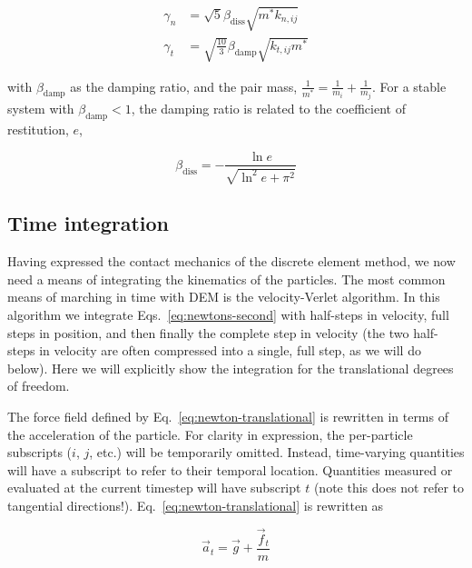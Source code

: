 \begin{subequations}
\begin{align}
	\gamma_n &= \sqrt{5}\beta_\text{diss}\sqrt{m^*k_{n,ij}} \\
	\gamma_t &= \sqrt{\frac{10}{3}}\beta_\text{damp}\sqrt{k_{t,ij} m^*}
\end{align}
\end{subequations}

with $\beta_\text{damp}$ as the damping ratio, and the pair mass, $\frac{1}{m^*} = \frac{1}{m_i} + \frac{1}{m_j}$. For a stable system with $\beta_\text{damp} < 1$, the damping ratio is related to the coefficient of restitution, $e$,

\begin{equation}
	\beta_\text{diss} = -\frac{\ln{e}}{\sqrt{\ln^2{e}+\pi^2}}
\end{equation}





\subsection{Time integration}

Having expressed the contact mechanics of the discrete element method, we now need a means of integrating the kinematics of the particles. The most common means of marching in time with DEM is the velocity-Verlet algorithm\cite{Kruggel-Emden2008}. In this algorithm we integrate Eqs.~\ref{eq:newtons-second} with half-steps in velocity, full steps in position, and then finally the complete step in velocity (the two half-steps in velocity are often compressed into a single, full step, as we will do below). Here we will explicitly show the integration for the translational degrees of freedom. 

The force field defined by Eq.~\ref{eq:newton-translational} is rewritten in terms of the acceleration of the particle. For clarity in expression, the per-particle subscripts ($i$, $j$, etc.) will be temporarily omitted. Instead, time-varying quantities will have a subscript to refer to their temporal location. Quantities measured or evaluated at the current timestep will have subscript $t$ (note this does not refer to tangential directions!). Eq.~\ref{eq:newton-translational} is rewritten as

\begin{equation}\label{eq:newton-acceleration}
	\vec{a}_t = \vec{g} + \frac{\vec{f}_t}{m}
\end{equation}

